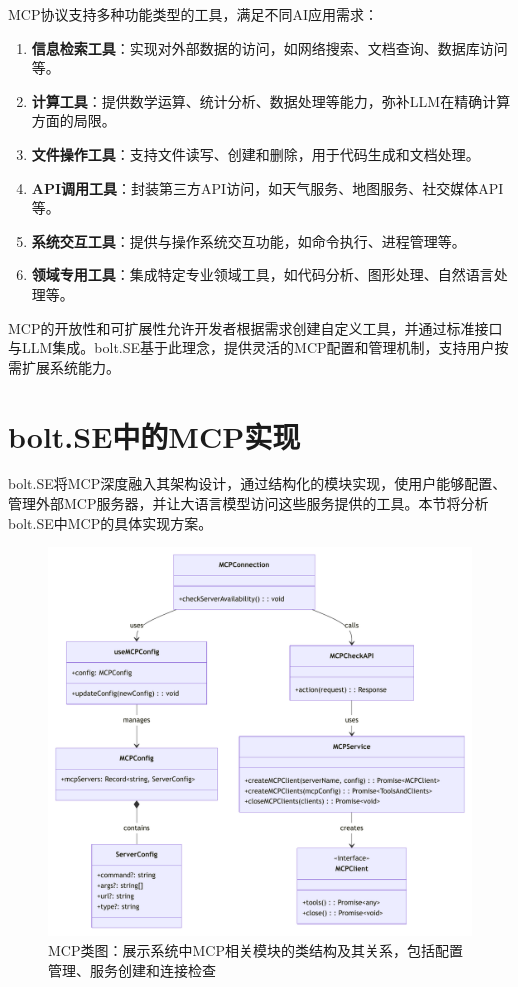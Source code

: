 MCP协议支持多种功能类型的工具，满足不同AI应用需求：

\begin{enumerate}
  \item \textbf{信息检索工具}：实现对外部数据的访问，如网络搜索、文档查询、数据库访问等。
  
  \item \textbf{计算工具}：提供数学运算、统计分析、数据处理等能力，弥补LLM在精确计算方面的局限。
  
  \item \textbf{文件操作工具}：支持文件读写、创建和删除，用于代码生成和文档处理。
  
  \item \textbf{API调用工具}：封装第三方API访问，如天气服务、地图服务、社交媒体API等。
  
  \item \textbf{系统交互工具}：提供与操作系统交互功能，如命令执行、进程管理等。
  
  \item \textbf{领域专用工具}：集成特定专业领域工具，如代码分析、图形处理、自然语言处理等。
\end{enumerate}

MCP的开放性和可扩展性允许开发者根据需求创建自定义工具，并通过标准接口与LLM集成。bolt.SE基于此理念，提供灵活的MCP配置和管理机制，支持用户按需扩展系统能力。

\section{bolt.SE中的MCP实现}

bolt.SE将MCP深度融入其架构设计，通过结构化的模块实现，使用户能够配置、管理外部MCP服务器，并让大语言模型访问这些服务提供的工具。本节将分析bolt.SE中MCP的具体实现方案。

\begin{figure}[htbp]
  \centering
  \includegraphics[width=\textwidth]{figures/mcp_class.pdf}
  \caption{MCP类图：展示系统中MCP相关模块的类结构及其关系，包括配置管理、服务创建和连接检查}
  \label{fig:mcp_class}
\end{figure}

